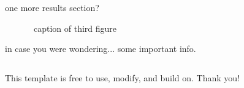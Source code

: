 \documentclass[final,hyperref={pdfpagelabels=false}]{beamer}
\begin{document}
\begin{frame}[t]
\begin{columns}[t]
\begin{column}{0.46\textwidth}
	\begin{alertblock}{one more results section?}
		\begin{figure}
			\caption{ \ caption of third figure }
		\end{figure}
	\end{alertblock}


\vspace{0.24cm}
	\begin{block}{in case you were wondering...}
some important info.



	\end{block}
\end{column} 



\begin{column}{0.02\textwidth}\end{column} %
\end{columns} 

{\Huge \faThumbsOUp} This template is free to use, modify, and build on. \textcolor{uscRed}{Thank you!}  

\end{frame} 
\end{document}
